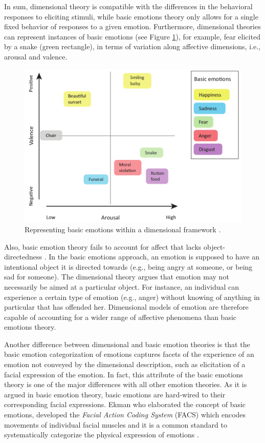 \documentclass[12pt]{report}
\begin{document}
In sum, dimensional theory is compatible with the differences in the behavioral
responses to eliciting stimuli, while basic emotions theory only allows for a
single fixed behavior of responses to a given emotion. Furthermore, dimensional
theories can represent instances of basic emotions (see Figure
\ref{fig:dimensional-discrete}), for example, fear elicited by a snake (green
rectangle), in terms of variation along affective dimensions, i.e., arousal and
valence.

\begin{figure}[tbh]
  \center
  \includegraphics[width=.9\textwidth]{figure/dimensional-discrete.png}
  \caption{Representing basic emotions within a dimensional framework
  \cite{hamann:mapping-discrete-dimensional}.}
  \label{fig:dimensional-discrete}
\end{figure}

Also, basic emotion theory fails to account for affect that lacks
object-directedness \cite{russell:core-affect}. In the basic emotions approach,
an emotion is supposed to have an intentional object it is directed towards (e.g.,
being angry at someone, or being sad for someone). The dimensional theory argues
that emotion may not necessarily be aimed at a particular object. For instance,
an individual can experience a certain type of emotion (e.g., anger) without
knowing of anything in particular that has offended her. Dimensional models of
emotion are therefore capable of accounting for a wider range of affective
phenomena than basic emotions theory.

Another difference between dimensional and basic emotion theories is that the
basic emotion categorization of emotions captures facets of the experience of
an emotion not conveyed by the dimensional description, such as elicitation of a
facial expression of the emotion. In fact, this attribute of the basic
emotions theory is one of the major differences with all other emotion theories.
As it is argued in basic emotion theory, basic emotions are hard-wired to their
corresponding facial expressions. Ekman who elaborated the concept of basic
emotions, developed the \textit{Facial Action Coding System} (FACS) which
encodes movements of individual facial muscles and it is a common standard to
systematically categorize the physical expression of emotions
\cite{ekman:facial-movement}.
\end{document}
